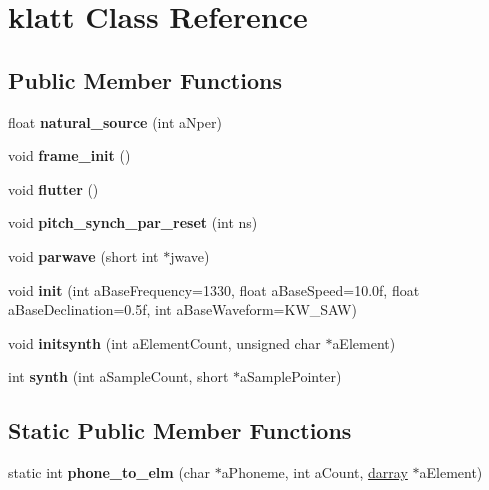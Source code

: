\hypertarget{classklatt}{}\section{klatt Class Reference}
\label{classklatt}
\subsection*{Public Member Functions}
\begin{DoxyCompactItemize}
\item 
\mbox{\label{classklatt_a557efb7058bce446168977a2e16e084e}} 
float {\bfseries natural\+\_\+source} (int a\+Nper)
\item 
\mbox{\label{classklatt_a9f7c34c73066b48c0b6d07e14281fe18}} 
void {\bfseries frame\+\_\+init} ()
\item 
\mbox{\label{classklatt_af29ecde26bea7f552912ee9cdca848fe}} 
void {\bfseries flutter} ()
\item 
\mbox{\label{classklatt_a232ceff7cb3ce97107b6cb28968add1c}} 
void {\bfseries pitch\+\_\+synch\+\_\+par\+\_\+reset} (int ns)
\item 
\mbox{\label{classklatt_a5772ef9cd3fd387347060995f3d08a79}} 
void {\bfseries parwave} (short int $\ast$jwave)
\item 
\mbox{\label{classklatt_a67b18a4ffdb5f62c42a29efbb0ae35ac}} 
void {\bfseries init} (int a\+Base\+Frequency=1330, float a\+Base\+Speed=10.\+0f, float a\+Base\+Declination=0.\+5f, int a\+Base\+Waveform=\+K\+W\+\_\+\+S\+A\+W)
\item 
\mbox{\label{classklatt_a433c6cb5f330028d2addfeb6263637dc}} 
void {\bfseries initsynth} (int a\+Element\+Count, unsigned char $\ast$a\+Element)
\item 
\mbox{\label{classklatt_a49e59a00d49254081be981f531471425}} 
int {\bfseries synth} (int a\+Sample\+Count, short $\ast$a\+Sample\+Pointer)
\end{DoxyCompactItemize}
\subsection*{Static Public Member Functions}
\begin{DoxyCompactItemize}
\item 
\mbox{\label{classklatt_ab10e1098249605b56d642942377acb1d}} 
static int {\bfseries phone\+\_\+to\+\_\+elm} (char $\ast$a\+Phoneme, int a\+Count, \mbox{\hyperlink{classdarray}{darray}} $\ast$a\+Element)
\end{DoxyCompactItemize}
